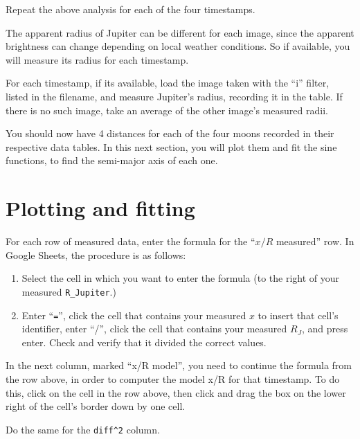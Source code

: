 \begin{steps}
	\item Repeat the above analysis for each of the four timestamps.
\end{steps}

The apparent radius of Jupiter can be different for each image, since the apparent brightness can change depending on local weather conditions. So if available, you will measure its radius for each timestamp.

\begin{steps} 
	\item For each timestamp, if its available, load the image taken with the ``i'' filter, listed in the filename, and measure Jupiter's radius, recording it in the table. If there is no such image, take an average of the other image's measured radii.
\end{steps}

You should now have 4 distances for each of the four moons recorded in their respective data tables. In this next section, you will plot them and fit the sine functions, to find the semi-major axis of each one.

\section{Plotting and fitting}

\begin{steps}
	\item For each row of measured data, enter the formula for the ``$x/R$ measured'' row. In Google Sheets, the procedure is as follows:
	\begin{enumerate}
		\item Select the cell in which you want to enter the formula (to the right of your measured \texttt{R\_Jupiter}.)
		
		\item Enter ``\texttt{=}'', click the cell that contains your measured $x$ to insert that cell's identifier, enter ``/'', click the cell that contains your measured $R_J$, and press enter. Check and verify that it divided the correct values.
	\end{enumerate}

	\item In the next column, marked ``x/R model'', you need to continue the formula from the row above, in order to computer the model x/R for that timestamp. To do this, click on the cell in the row above, then click and drag the box on the lower right of the cell's border down by one cell.
	
	\item Do the same for the \texttt{diff\^{}2} column.
\end{steps}

